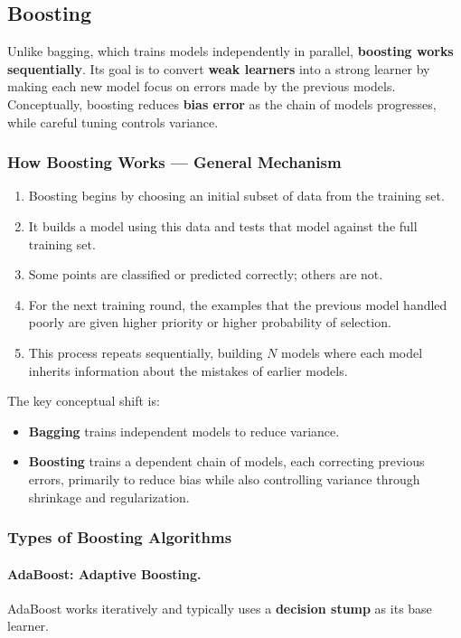 \documentclass[12pt,openany]{book}
\begin{document}
\subsection{Boosting}

Unlike bagging, which trains models independently in parallel, \textbf{boosting works sequentially}. Its goal is to convert \textbf{weak learners} into a strong learner by making each new model focus on errors made by the previous models. Conceptually, boosting reduces \textbf{bias error} as the chain of models progresses, while careful tuning controls variance.

\subsubsection{How Boosting Works --- General Mechanism}

\begin{enumerate}[leftmargin=*]
    \item Boosting begins by choosing an initial subset of data from the training set.
    \item It builds a model using this data and tests that model against the full training set.
    \item Some points are classified or predicted correctly; others are not.
    \item For the next training round, the examples that the previous model handled poorly are given higher priority or higher probability of selection.
    \item This process repeats sequentially, building \(N\) models where each model inherits information about the mistakes of earlier models.
\end{enumerate}

The key conceptual shift is:
\begin{itemize}[leftmargin=*]
    \item \textbf{Bagging} trains independent models to reduce variance.
    \item \textbf{Boosting} trains a dependent chain of models, each correcting previous errors, primarily to reduce bias while also controlling variance through shrinkage and regularization.
\end{itemize}

\subsubsection{Types of Boosting Algorithms}

\paragraph{AdaBoost: Adaptive Boosting.}
AdaBoost works iteratively and typically uses a \textbf{decision stump} as its base learner.
\end{document}
